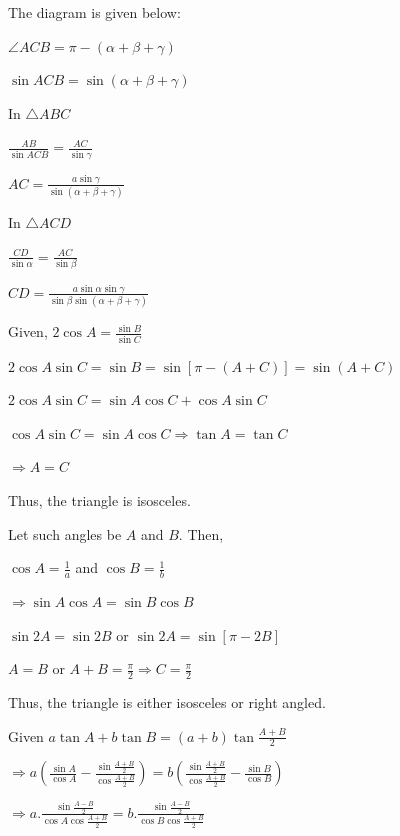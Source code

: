 \item The diagram is given below:

  \startplacefigure
    \externalfigure[18_11.pdf]
  \stopplacefigure

  $\angle ACB = \pi - (\alpha + \beta + \gamma)$

  $\sin ACB = \sin(\alpha + \beta + \gamma)$

  In $\triangle ABC$

  $\frac{AB}{\sin ACB} = \frac{AC}{\sin\gamma}$

  $AC = \frac{a\sin\gamma}{\sin(\alpha + \beta + \gamma)}$

  In $\triangle ACD$

  $\frac{CD}{\sin\alpha} = \frac{AC}{\sin\beta}$

  $CD = \frac{a\sin\alpha\sin\gamma}{\sin\beta\sin(\alpha + \beta + \gamma)}$

\item Given, $2\cos A = \frac{\sin B}{\sin C}$

  $2\cos A\sin C = \sin B = \sin[\pi - (A + C)] = \sin(A + C)$

  $2\cos A\sin C = \sin A\cos C + \cos A\sin C$

  $\cos A\sin C = \sin A\cos C\Rightarrow \tan A = \tan C$

  $\Rightarrow A = C$

  Thus, the triangle is isosceles.

\item Let such angles be $A$ and $B.$ Then,

  $\cos A = \frac{1}{a}$ and $\cos B = \frac{1}{b}$

  $\Rightarrow \sin A\cos A = \sin B\cos B$

  $\sin 2A = \sin 2B$ or $\sin 2A = \sin[\pi - 2B]$

  $A = B$ or $A + B = \frac{\pi}{2} \Rightarrow C = \frac{\pi}{2}$

  Thus, the triangle is either isosceles or right angled.

\item Given $a\tan A + b\tan B = (a + b)\tan \frac{A + B}{2}$

  $\Rightarrow a\left(\frac{\sin A}{\cos A} - \frac{\sin \frac{A + B}{2}}{\cos\frac{A + B}{2}}\right) =
  b\left(\frac{\sin\frac{A + B}{2}}{\cos \frac{A + B}{2}} - \frac{\sin B}{\cos B}\right)$

  $\Rightarrow a.\frac{\sin\frac{A - B}{2}}{\cos A\cos \frac{A + B}{2}} = b.\frac{\sin\frac{A - B}{2}}{\cos B\cos\frac{A +
      B}{2}}$

